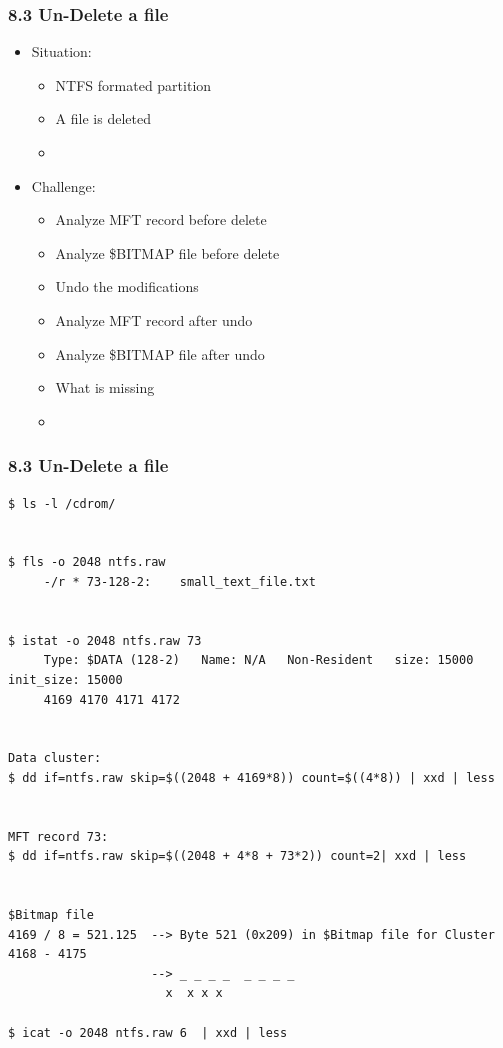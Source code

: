 \begin{frame}[fragile]
  \frametitle{8.3 Un-Delete a file}
  \begin{itemize}
    \item Situation:
    \begin{itemize}
      \item NTFS formated partition
      \item A file is deleted
      \item[]
    \end{itemize}
    \item Challenge:
    \begin{itemize}
      \item Analyze MFT record before delete
      \item Analyze \$BITMAP file before delete
      \item Undo the modifications
      \item Analyze MFT record after undo
      \item Analyze \$BITMAP file after undo
      \item What is missing
      \item[]
    \end{itemize}
  \end{itemize}
\end{frame}


\begin{frame}[fragile]
  \frametitle{8.3 Un-Delete a file}
  \begin{lstlisting}[basicstyle=\tiny]
$ ls -l /cdrom/

  
$ fls -o 2048 ntfs.raw 
     -/r * 73-128-2:	small_text_file.txt


$ istat -o 2048 ntfs.raw 73
     Type: $DATA (128-2)   Name: N/A   Non-Resident   size: 15000  init_size: 15000
     4169 4170 4171 4172
  

Data cluster:
$ dd if=ntfs.raw skip=$((2048 + 4169*8)) count=$((4*8)) | xxd | less
 

MFT record 73: 
$ dd if=ntfs.raw skip=$((2048 + 4*8 + 73*2)) count=2| xxd | less


$Bitmap file
4169 / 8 = 521.125  --> Byte 521 (0x209) in $Bitmap file for Cluster 4168 - 4175
                    --> _ _ _ _  _ _ _ _
		              x  x x x   

$ icat -o 2048 ntfs.raw 6  | xxd | less
  \end{lstlisting}
\end{frame}


